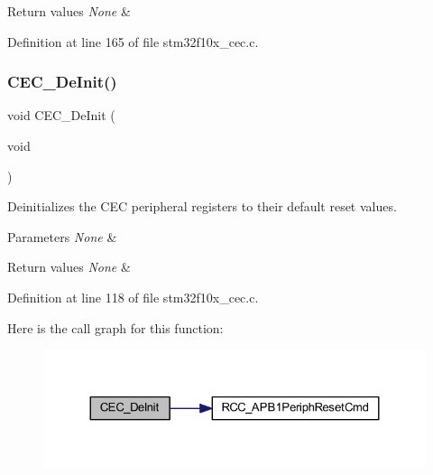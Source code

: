 \begin{DoxyRetVals}{Return values}
{\em None} & \\
\hline
\end{DoxyRetVals}


Definition at line 165 of file stm32f10x\+\_\+cec.\+c.

\mbox{\label{group___c_e_c___private___functions_ga604c3b15b51a46303c201fa3deac2212}} 
\subsubsection{\texorpdfstring{C\+E\+C\+\_\+\+De\+Init()}{CEC\_DeInit()}}
{\footnotesize\ttfamily void C\+E\+C\+\_\+\+De\+Init (\begin{DoxyParamCaption}\item[{void}]{ }\end{DoxyParamCaption})}



Deinitializes the C\+EC peripheral registers to their default reset values. 


\begin{DoxyParams}{Parameters}
{\em None} & \\
\hline
\end{DoxyParams}

\begin{DoxyRetVals}{Return values}
{\em None} & \\
\hline
\end{DoxyRetVals}


Definition at line 118 of file stm32f10x\+\_\+cec.\+c.

Here is the call graph for this function\+:
\nopagebreak
\begin{figure}[H]
\begin{center}
\leavevmode
\includegraphics[width=324pt]{group___c_e_c___private___functions_ga604c3b15b51a46303c201fa3deac2212_cgraph}
\end{center}
\end{figure}
\mbox{\label{group___c_e_c___private___functions_ga1e2cf6e3a1ac891f2814f9d3f4043574}} 
